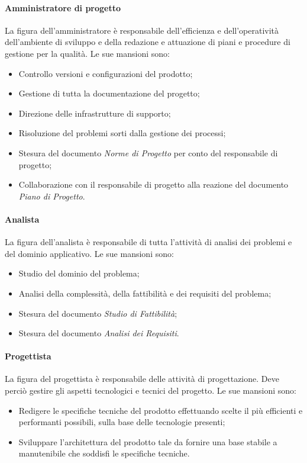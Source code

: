 			\paragraph{Amministratore di progetto}
				La figura dell'amministratore è responsabile dell'efficienza e dell'operatività dell'ambiente di sviluppo e della redazione e attuazione di piani e procedure di gestione per la qualità.
				Le sue mansioni sono:
				\begin{itemize}
					\item Controllo versioni e configurazioni del prodotto;
					\item Gestione di tutta la documentazione del progetto;
					\item Direzione delle infrastrutture di supporto;
					\item Risoluzione del problemi sorti dalla gestione dei processi;
					\item Stesura del documento \textit{Norme di Progetto} per conto del responsabile di progetto;
					\item Collaborazione con il responsabile di progetto alla reazione del documento \textit{Piano di Progetto}.
				\end{itemize}
			\paragraph{Analista}
				La figura dell'analista è responsabile di tutta l'attività di analisi dei problemi e del dominio applicativo.
				Le sue mansioni sono:
				\begin{itemize}
					\item Studio del dominio del problema;
					\item Analisi della complessità, della fattibilità e dei requisiti del problema;
					\item Stesura del documento \textit{Studio di Fattibilità};
					\item Stesura del documento \textit{Analisi dei Requisiti}.
				\end{itemize}
			\paragraph{Progettista}
				La figura del progettista è responsabile delle attività di progettazione. Deve perciò gestire gli aspetti tecnologici e tecnici del progetto.
				Le sue mansioni sono:
				\begin{itemize}
					\item Redigere le specifiche tecniche del prodotto effettuando scelte il più efficienti e performanti possibili, sulla base delle tecnologie presenti;
					\item Sviluppare l'architettura del prodotto tale da fornire una base stabile a manutenibile che soddisfi le specifiche tecniche.
				\end{itemize}
